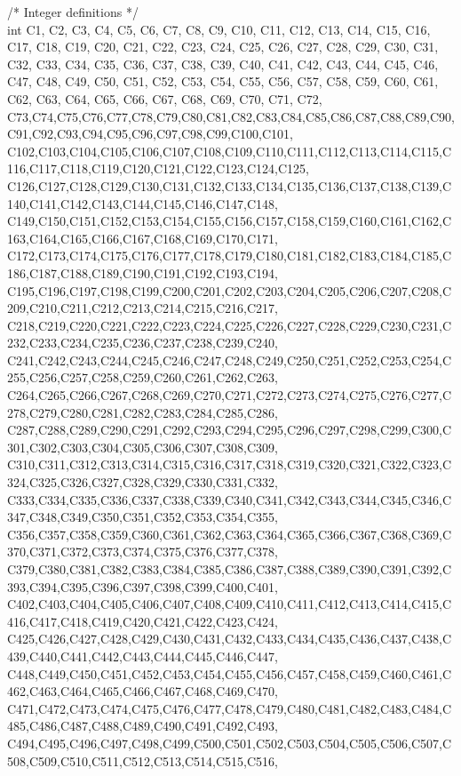 /* Integer definitions */ \\
int C1, C2, C3, C4, C5, C6, C7, C8, C9, C10, C11, C12, C13, C14, C15, C16, C17, C18, C19, C20, C21, C22, C23, C24, C25, C26, C27, C28, C29, C30, C31, C32, C33, C34, C35, C36, C37, C38, C39, C40, C41, C42, C43, C44, C45, C46, C47, C48, C49, C50, C51, C52, C53, C54, C55, C56, C57, C58, C59, C60, C61, C62, C63, C64, C65, C66, C67, C68, C69, C70, C71, C72, C73,C74,C75,C76,C77,C78,C79,C80,C81,C82,C83,C84,C85,C86,C87,C88,C89,C90,C91,C92,C93,C94,C95,C96,C97,C98,C99,C100,C101, C102,C103,C104,C105,C106,C107,C108,C109,C110,C111,C112,C113,C114,C115,C116,C117,C118,C119,C120,C121,C122,C123,C124,C125, C126,C127,C128,C129,C130,C131,C132,C133,C134,C135,C136,C137,C138,C139,C140,C141,C142,C143,C144,C145,C146,C147,C148, C149,C150,C151,C152,C153,C154,C155,C156,C157,C158,C159,C160,C161,C162,C163,C164,C165,C166,C167,C168,C169,C170,C171, C172,C173,C174,C175,C176,C177,C178,C179,C180,C181,C182,C183,C184,C185,C186,C187,C188,C189,C190,C191,C192,C193,C194, C195,C196,C197,C198,C199,C200,C201,C202,C203,C204,C205,C206,C207,C208,C209,C210,C211,C212,C213,C214,C215,C216,C217,
C218,C219,C220,C221,C222,C223,C224,C225,C226,C227,C228,C229,C230,C231,C232,C233,C234,C235,C236,C237,C238,C239,C240,
C241,C242,C243,C244,C245,C246,C247,C248,C249,C250,C251,C252,C253,C254,C255,C256,C257,C258,C259,C260,C261,C262,C263,
C264,C265,C266,C267,C268,C269,C270,C271,C272,C273,C274,C275,C276,C277,C278,C279,C280,C281,C282,C283,C284,C285,C286,
C287,C288,C289,C290,C291,C292,C293,C294,C295,C296,C297,C298,C299,C300,C301,C302,C303,C304,C305,C306,C307,C308,C309,
C310,C311,C312,C313,C314,C315,C316,C317,C318,C319,C320,C321,C322,C323,C324,C325,C326,C327,C328,C329,C330,C331,C332,
C333,C334,C335,C336,C337,C338,C339,C340,C341,C342,C343,C344,C345,C346,C347,C348,C349,C350,C351,C352,C353,C354,C355,
C356,C357,C358,C359,C360,C361,C362,C363,C364,C365,C366,C367,C368,C369,C370,C371,C372,C373,C374,C375,C376,C377,C378,
C379,C380,C381,C382,C383,C384,C385,C386,C387,C388,C389,C390,C391,C392,C393,C394,C395,C396,C397,C398,C399,C400,C401,
C402,C403,C404,C405,C406,C407,C408,C409,C410,C411,C412,C413,C414,C415,C416,C417,C418,C419,C420,C421,C422,C423,C424,
C425,C426,C427,C428,C429,C430,C431,C432,C433,C434,C435,C436,C437,C438,C439,C440,C441,C442,C443,C444,C445,C446,C447,
C448,C449,C450,C451,C452,C453,C454,C455,C456,C457,C458,C459,C460,C461,C462,C463,C464,C465,C466,C467,C468,C469,C470,
C471,C472,C473,C474,C475,C476,C477,C478,C479,C480,C481,C482,C483,C484,C485,C486,C487,C488,C489,C490,C491,C492,C493,
C494,C495,C496,C497,C498,C499,C500,C501,C502,C503,C504,C505,C506,C507,C508,C509,C510,C511,C512,C513,C514,C515,C516,
